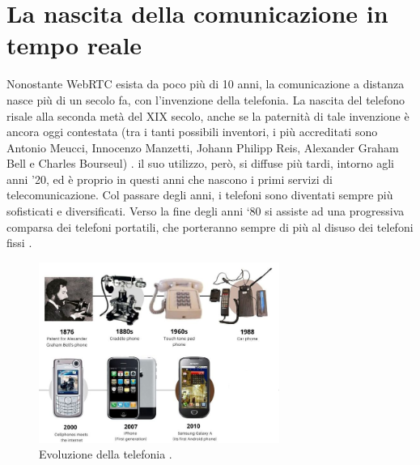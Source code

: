 \documentclass[11pt, a4paper, openany]{book}
\begin{document}
 	\section{La nascita della comunicazione in tempo reale}
 	Nonostante WebRTC esista da poco più di 10 anni, la comunicazione a distanza nasce più di un secolo fa, con l'invenzione della telefonia. La nascita del telefono risale alla seconda metà del XIX secolo, anche se la paternità di tale invenzione è ancora oggi contestata (tra i tanti possibili inventori, i più accreditati sono Antonio Meucci, Innocenzo Manzetti, Johann Philipp Reis, Alexander Graham Bell e Charles Bourseul) \cite{1}. il suo utilizzo, però, si diffuse più tardi, intorno agli anni '20, ed è proprio in questi anni che nascono i primi servizi di telecomunicazione. Col passare degli anni, i telefoni sono diventati sempre più sofisticati e diversificati. Verso la fine degli anni ‘80 si assiste ad una progressiva comparsa dei telefoni portatili, che porteranno sempre di più al disuso dei telefoni fissi \cite{2}.
 	\begin{figure}[h!]
 		\centering
 		\includegraphics[width=0.7\textwidth]{img/TelEvo.png}
 		\caption{Evoluzione della telefonia \cite{55}.}
 	\end{figure}
 	\newpage
\end{document}
